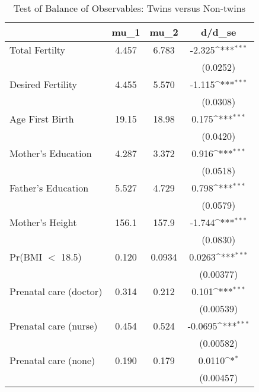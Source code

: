 \begin{table}[htbp]\centering
\def\sym#1{\ifmmode^{#1}\else\(^{#1}\)\fi}
\caption{Test of Balance of Observables: Twins versus Non-twins \label{TWINtab:comp}}
\begin{tabular}{l*{1}{ccc}}
\toprule
                    &        mu\_1&        mu\_2&      d/d\_se         \\
\midrule
Total Fertilty      &       4.457&       6.783&      -2.325\sym{***}\\
                    &            &            &    (0.0252)         \\
Desired Fertility   &       4.455&       5.570&      -1.115\sym{***}\\
                    &            &            &    (0.0308)         \\
Age First Birth     &       19.15&       18.98&       0.175\sym{***}\\
                    &            &            &    (0.0420)         \\
Mother's Education  &       4.287&       3.372&       0.916\sym{***}\\
                    &            &            &    (0.0518)         \\
Father's Education  &       5.527&       4.729&       0.798\sym{***}\\
                    &            &            &    (0.0579)         \\
Mother's Height     &       156.1&       157.9&      -1.744\sym{***}\\
                    &            &            &    (0.0830)         \\
Pr(BMI $<$ 18.5)    &       0.120&      0.0934&      0.0263\sym{***}\\
                    &            &            &   (0.00377)         \\
Prenatal care (doctor)&       0.314&       0.212&       0.101\sym{***}\\
                    &            &            &   (0.00539)         \\
Prenatal care (nurse)&       0.454&       0.524&     -0.0695\sym{***}\\
                    &            &            &   (0.00582)         \\
Prenatal care (none)&       0.190&       0.179&      0.0110\sym{*}  \\
                    &            &            &   (0.00457)         \\

\end{tabular}
\end{table}

